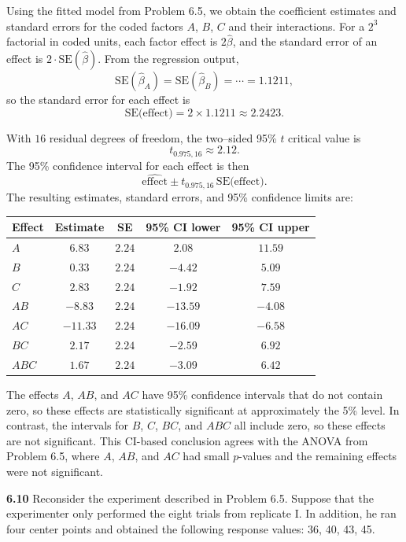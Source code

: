 \documentclass[answers,12pt,addpoints]{exam}
\begin{document}
\begin{solution}

Using the fitted model from Problem 6.5, we obtain the coefficient estimates and standard errors for the coded factors $A$, $B$, $C$ and their interactions. For a $2^3$ factorial in coded units, each factor effect is $2\hat\beta$, and the standard error of an effect is $2\cdot \text{SE}(\hat\beta)$. From the regression output,
\[
\text{SE}(\hat\beta_A) = \text{SE}(\hat\beta_B) = \cdots = 1.1211,
\]
so the standard error for each effect is
\[
\text{SE(effect)} = 2 \times 1.1211 \approx 2.2423.
\]

With $16$ residual degrees of freedom, the two–sided 95\% $t$ critical value is
\[
t_{0.975,16} \approx 2.12.
\]
The 95\% confidence interval for each effect is then
\[
\hat{\text{effect}} \pm t_{0.975,16}\,\text{SE(effect)}.
\]
The resulting estimates, standard errors, and 95\% confidence limits are:

\begin{center}
\begin{tabular}{lcccc}
\hline
Effect & Estimate & SE & 95\% CI lower & 95\% CI upper \\
\hline
$A$   & $6.83$   & $2.24$ & $2.08$   & $11.59$ \\
$B$   & $0.33$   & $2.24$ & $-4.42$  & $5.09$ \\
$C$   & $2.83$   & $2.24$ & $-1.92$  & $7.59$ \\
$AB$  & $-8.83$  & $2.24$ & $-13.59$ & $-4.08$ \\
$AC$  & $-11.33$ & $2.24$ & $-16.09$ & $-6.58$ \\
$BC$  & $2.17$   & $2.24$ & $-2.59$  & $6.92$ \\
$ABC$ & $1.67$   & $2.24$ & $-3.09$  & $6.42$ \\
\hline
\end{tabular}
\end{center}

The effects $A$, $AB$, and $AC$ have 95\% confidence intervals that do not contain zero, so these effects are statistically significant at approximately the 5\% level. In contrast, the intervals for $B$, $C$, $BC$, and $ABC$ all include zero, so these effects are not significant. This CI-based conclusion agrees with the ANOVA from Problem 6.5, where $A$, $AB$, and $AC$ had small $p$-values and the remaining effects were not significant.

\end{solution}

\textbf{6.10}
Reconsider the experiment described in Problem 6.5. Suppose that the experimenter only performed the eight trials from replicate I. In addition, he ran four center points and obtained the following response values: 36, 40, 43, 45.
\end{document}
